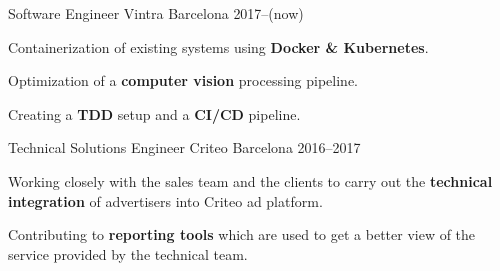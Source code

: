 

\begin{cventries}

  \cventry
    {Software Engineer} %
    {Vintra} %
    {Barcelona} %
    {2017--(now)} %
    {
      \begin{cvitems} %
\item {Containerization of existing systems using \textbf{Docker \& Kubernetes}.}
\item {Optimization of a \textbf{computer vision} processing pipeline.}
\item {Creating a \textbf{TDD} setup and a \textbf{CI/CD} pipeline.}
      \end{cvitems}
    }
    {}
  \cventry
    {Technical Solutions Engineer} %
    {Criteo} %
    {Barcelona} %
    {2016--2017} %
    {
      \begin{cvitems} %
        \item {Working closely with the sales team and the clients to carry out the \textbf{technical integration} of advertisers into Criteo ad platform.}
\item {Contributing to \textbf{reporting tools} which are used to get a better view of the service provided by the technical team.}

\end{cvitems}}
\end{cventries}
